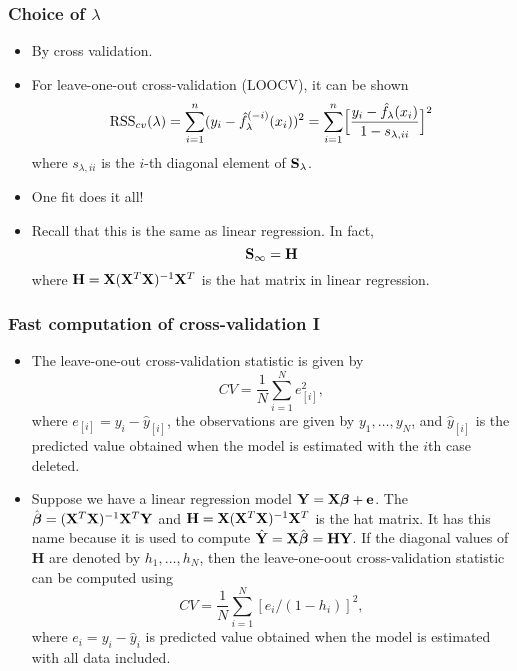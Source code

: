 \documentclass{beamer}
\def\bfX{{\bf X}}
\def\bfY{{\bf Y}}
\def \bfbeta {\boldsymbol{\beta}}
\begin{document}
\begin{frame}
	\frametitle{Choice of $\lambda$}
	\begin{itemize}
		\item  By cross validation.
		\item For leave-one-out cross-validation (LOOCV), it can be  shown
		$$\hbox{RSS}_{cv}(\lambda)= \sum_{i=1}^n (y_i - \hat f_\lambda^{(-i)}(x_i))^2
	= \sum_{i=1}^n \Bigl[ \frac{y_i - \hat f_{\lambda}(x_i) }{1- s_{\lambda, ii}}\Bigr]^2 $$
		where $s_{\lambda, ii}$ is the $i$-th diagonal element of ${\bf S}_\lambda$.
		\item One fit does it all! 
		\item Recall that this is the same as linear regression. 
		In fact, 
		$${\bf S}_{\infty} =  {\bf H}$$
		where ${\bf H}= {\bf X}({\bf X}^T {\bf X})^{-1} {\bf X}^T$ is the hat matrix in linear regression. 
		
	\end{itemize}
\end{frame} 

\begin{frame}
\frametitle{Fast computation of cross-validation I}

\begin{itemize}\small
  \item The leave-one-out cross-validation statistic is given by $$ CV = \frac{1}{N}\sum^N_{i=1} e^2_{[i]},$$
  where $e_{[i]}= y_i -\hat{y}_{[i]}$, the observations are given by $y_1,\dots, y_N$, and $\hat{y}_{[i]}$ is the predicted value obtained when the model is estimated with the $i$th case deleted.
  \item Suppose we have a linear regression model $\mathbf{Y} = \bfX \bfbeta + \mathbf{e}$. The $\hat{\bfbeta} = (\bfX^T \bfX)^{-1}\bfX^T \bfY$ and $\mathbf{H} = \bfX(\bfX^T \bfX)^{-1}\bfX^T$ is the hat matrix. It has this name because it is used to compute $\hat{\bfY}=\bfX \hat{\bfbeta} = \mathbf{H} \bfY$. If the diagonal values of $\mathbf{H}$ are denoted by $h_1,\dots,h_N$, then the leave-one-oout cross-validation statistic can be computed using
  $$CV=\frac{1}{N}\sum^N_{i=1} [e_i /(1-h_i)]^2,$$
  where $e_i = y_i - \hat{y}_i$ is predicted value obtained when the model is estimated with all data included.
\end{itemize}

\end{frame}
\end{document}
